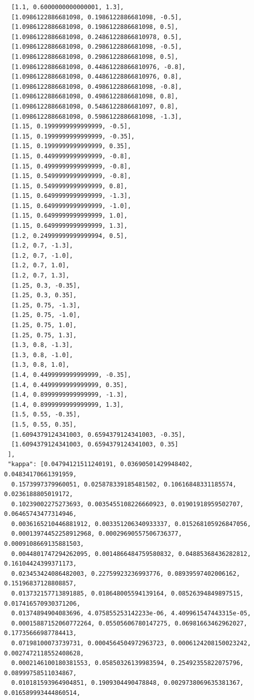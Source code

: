\documentclass[11pt,reqno]{amsart}
\numberwithin{equation}{section}
\theoremstyle{definition}
\theoremstyle{remark}
\begin{document}
\begin{lstlisting}
  [1.1, 0.6000000000000001, 1.3],
  [1.0986122886681098, 0.1986122886681098, -0.5],
  [1.0986122886681098, 0.1986122886681098, 0.5],
  [1.0986122886681098, 0.24861228866810978, 0.5],
  [1.0986122886681098, 0.2986122886681098, -0.5],
  [1.0986122886681098, 0.2986122886681098, 0.5],
  [1.0986122886681098, 0.44861228866810976, -0.8],
  [1.0986122886681098, 0.44861228866810976, 0.8],
  [1.0986122886681098, 0.4986122886681098, -0.8],
  [1.0986122886681098, 0.4986122886681098, 0.8],
  [1.0986122886681098, 0.5486122886681097, 0.8],
  [1.0986122886681098, 0.5986122886681098, -1.3],
  [1.15, 0.1999999999999999, -0.5],
  [1.15, 0.1999999999999999, -0.35],
  [1.15, 0.1999999999999999, 0.35],
  [1.15, 0.4499999999999999, -0.8],
  [1.15, 0.4999999999999999, -0.8],
  [1.15, 0.5499999999999999, -0.8],
  [1.15, 0.5499999999999999, 0.8],
  [1.15, 0.6499999999999999, -1.3],
  [1.15, 0.6499999999999999, -1.0],
  [1.15, 0.6499999999999999, 1.0],
  [1.15, 0.6499999999999999, 1.3],
  [1.2, 0.24999999999999994, 0.5],
  [1.2, 0.7, -1.3],
  [1.2, 0.7, -1.0],
  [1.2, 0.7, 1.0],
  [1.2, 0.7, 1.3],
  [1.25, 0.3, -0.35],
  [1.25, 0.3, 0.35],
  [1.25, 0.75, -1.3],
  [1.25, 0.75, -1.0],
  [1.25, 0.75, 1.0],
  [1.25, 0.75, 1.3],
  [1.3, 0.8, -1.3],
  [1.3, 0.8, -1.0],
  [1.3, 0.8, 1.0],
  [1.4, 0.4499999999999999, -0.35],
  [1.4, 0.4499999999999999, 0.35],
  [1.4, 0.8999999999999999, -1.3],
  [1.4, 0.8999999999999999, 1.3],
  [1.5, 0.55, -0.35],
  [1.5, 0.55, 0.35],
  [1.6094379124341003, 0.6594379124341003, -0.35],
  [1.6094379124341003, 0.6594379124341003, 0.35]
 ],
 "kappa": [0.04794121511240191, 0.03690501429948402, 0.04834170661391959,
  0.1573997379960051, 0.025878339185481502, 0.10616848331185574, 0.0236188805019172,
  0.10239002275273693, 0.0035455108226660923, 0.01901918959502707, 0.06465743477314946,
  0.0036165210446881912, 0.003351206340933337, 0.015268105926847056,
  0.00013974452258912968, 0.00029690557506736377, 0.0009108669135881503,
  0.0044801747294262095, 0.0014866484759580832, 0.04885368436282812, 0.16104424399371173,
  0.023453424086482003, 0.22759923236993776, 0.08939597402006162, 0.15196837128808857,
  0.013732157713891885, 0.018648005594139164, 0.08526394849897515, 0.017416570930371206,
  0.01374894904083696, 4.075855253142233e-06, 4.409961547443315e-05,
  0.00015887152060772264, 0.05505606780147275, 0.06981663462962027, 0.17735666987784413,
  0.07198100073739731, 0.0004564504972963723, 0.0006124208150023242, 0.0027472118552408628,
  0.0002146100180381553, 0.05850326139983594, 0.25492355822075796, 0.08999758511034867,
  0.010181593964904851, 0.1909304490478848, 0.0029738069635381367, 0.016589993444860514,

\end{lstlisting}
\end{document}
